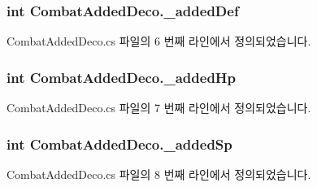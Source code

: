 \subsubsection[{\texorpdfstring{\+\_\+added\+Def}{_addedDef}}]{\setlength{\rightskip}{0pt plus 5cm}int Combat\+Added\+Deco.\+\_\+added\+Def\hspace{0.3cm}{\ttfamily [private]}}\hypertarget{class_combat_added_deco_abb40c78d41f1f133a285415b70506940}{}\label{class_combat_added_deco_abb40c78d41f1f133a285415b70506940}


Combat\+Added\+Deco.\+cs 파일의 6 번째 라인에서 정의되었습니다.

\subsubsection[{\texorpdfstring{\+\_\+added\+Hp}{_addedHp}}]{\setlength{\rightskip}{0pt plus 5cm}int Combat\+Added\+Deco.\+\_\+added\+Hp\hspace{0.3cm}{\ttfamily [private]}}\hypertarget{class_combat_added_deco_aa6d7287956c39e242ed254faf29e6a3b}{}\label{class_combat_added_deco_aa6d7287956c39e242ed254faf29e6a3b}


Combat\+Added\+Deco.\+cs 파일의 7 번째 라인에서 정의되었습니다.

\subsubsection[{\texorpdfstring{\+\_\+added\+Sp}{_addedSp}}]{\setlength{\rightskip}{0pt plus 5cm}int Combat\+Added\+Deco.\+\_\+added\+Sp\hspace{0.3cm}{\ttfamily [private]}}\hypertarget{class_combat_added_deco_a02d5c40dcf180b1ad7086856dfa83929}{}\label{class_combat_added_deco_a02d5c40dcf180b1ad7086856dfa83929}


Combat\+Added\+Deco.\+cs 파일의 8 번째 라인에서 정의되었습니다.

